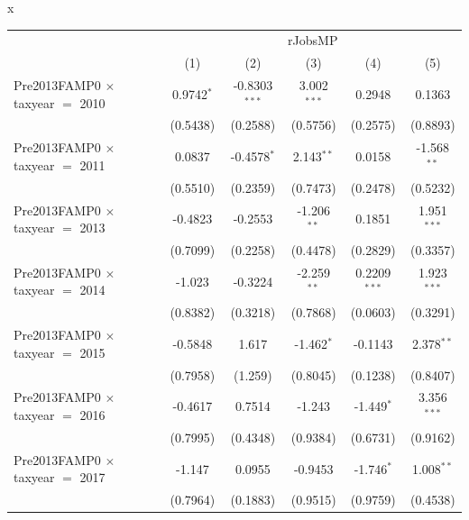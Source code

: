 x
\begingroup
\centering
\begin{tabular}{lccccc}
   \toprule
    & \multicolumn{5}{c}{rJobsMP}\\
                                           & (1)           & (2)             & (3)           & (4)            & (5)\\  
   \midrule 
   Pre2013FAMP0 $\times$ taxyear $=$ 2010  & 0.9742$^{*}$  & -0.8303$^{***}$ & 3.002$^{***}$ & 0.2948         & 0.1363\\   
                                           & (0.5438)      & (0.2588)        & (0.5756)      & (0.2575)       & (0.8893)\\   
   Pre2013FAMP0 $\times$ taxyear $=$ 2011  & 0.0837        & -0.4578$^{*}$   & 2.143$^{**}$  & 0.0158         & -1.568$^{**}$\\   
                                           & (0.5510)      & (0.2359)        & (0.7473)      & (0.2478)       & (0.5232)\\   
   Pre2013FAMP0 $\times$ taxyear $=$ 2013  & -0.4823       & -0.2553         & -1.206$^{**}$ & 0.1851         & 1.951$^{***}$\\   
                                           & (0.7099)      & (0.2258)        & (0.4478)      & (0.2829)       & (0.3357)\\   
   Pre2013FAMP0 $\times$ taxyear $=$ 2014  & -1.023        & -0.3224         & -2.259$^{**}$ & 0.2209$^{***}$ & 1.923$^{***}$\\   
                                           & (0.8382)      & (0.3218)        & (0.7868)      & (0.0603)       & (0.3291)\\   
   Pre2013FAMP0 $\times$ taxyear $=$ 2015  & -0.5848       & 1.617           & -1.462$^{*}$  & -0.1143        & 2.378$^{**}$\\   
                                           & (0.7958)      & (1.259)         & (0.8045)      & (0.1238)       & (0.8407)\\   
   Pre2013FAMP0 $\times$ taxyear $=$ 2016  & -0.4617       & 0.7514          & -1.243        & -1.449$^{*}$   & 3.356$^{***}$\\   
                                           & (0.7995)      & (0.4348)        & (0.9384)      & (0.6731)       & (0.9162)\\   
   Pre2013FAMP0 $\times$ taxyear $=$ 2017  & -1.147        & 0.0955          & -0.9453       & -1.746$^{*}$   & 1.008$^{**}$\\   
                                           & (0.7964)      & (0.1883)        & (0.9515)      & (0.9759)       & (0.4538)\\   

\end{tabular}
